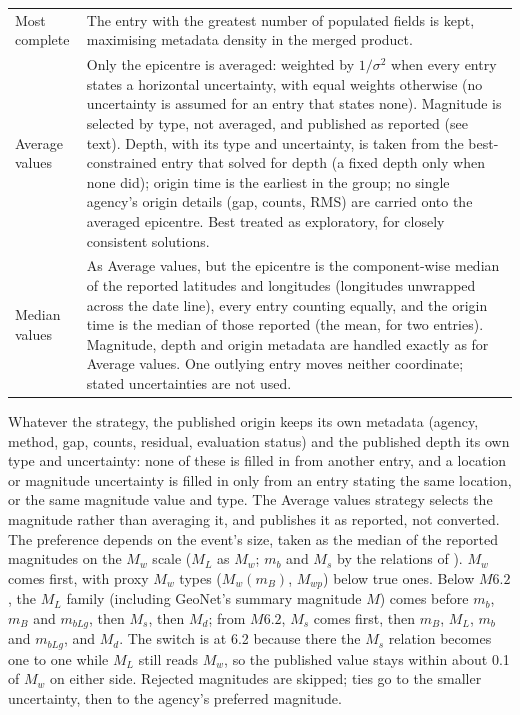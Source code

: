 \documentclass[12pt]{article}
\begin{document}
\begin{table}[htbp]
\begin{tabular}{@{}lp{10.4cm}@{}}
Most complete
  & The entry with the greatest number of populated fields is kept,
    maximising metadata density in the merged product. \\
Average values
  & Only the epicentre is averaged: weighted by $1/\sigma^{2}$ when every entry
    states a horizontal uncertainty, with equal weights otherwise (no
    uncertainty is assumed for an entry that states none).  Magnitude is selected
    by type, not averaged, and published as reported (see text).  Depth, with its
    type and uncertainty, is taken from the best-constrained entry that solved
    for depth (a fixed depth
    only when none did); origin time is the earliest in the group; no single
    agency's origin details (gap, counts, RMS) are carried onto the averaged
    epicentre.  Best treated as exploratory, for closely consistent
    solutions. \\
Median values
  & As Average values, but the epicentre is the component-wise median of the
    reported latitudes and longitudes (longitudes unwrapped across the date
    line), every entry counting equally, and the origin time is the median of
    those reported (the mean, for two entries).  Magnitude, depth and origin
    metadata are handled exactly as for Average values.  One outlying entry
    moves neither coordinate; stated uncertainties are not used. \\
\bottomrule
\end{tabular}
\end{table}

Whatever the strategy, the published origin keeps its own metadata (agency,
method, gap, counts, residual, evaluation status) and the published depth its own
type and uncertainty: none of these is filled in from another entry, and a
location or magnitude uncertainty is filled in only from an entry stating the
same location, or the same magnitude value and type.  The Average values strategy
selects the magnitude rather than averaging it, and publishes it as reported, not
converted.  The preference depends on the event's size, taken as the median of the
reported magnitudes on the $M_w$ scale ($M_L$ as $M_w$; $m_b$ and $M_s$ by the
relations of \citealp{scordilis2006}).  $M_w$ comes first, with proxy $M_w$ types
($M_w(m_B)$, $M_{wp}$) below true ones.  Below $M6.2$, the $M_L$ family (including
GeoNet's summary magnitude $M$) comes before $m_b$, $m_B$ and $m_{bLg}$, then
$M_s$, then $M_d$; from $M6.2$, $M_s$ comes first, then $m_B$, $M_L$, $m_b$ and
$m_{bLg}$, and $M_d$.  The switch is at 6.2 because there the $M_s$ relation
becomes one to one while $M_L$ still reads $M_w$, so the published value stays
within about 0.1 of $M_w$ on either side.  Rejected magnitudes are skipped; ties go
to the smaller uncertainty, then to the agency's preferred magnitude.
\end{document}
